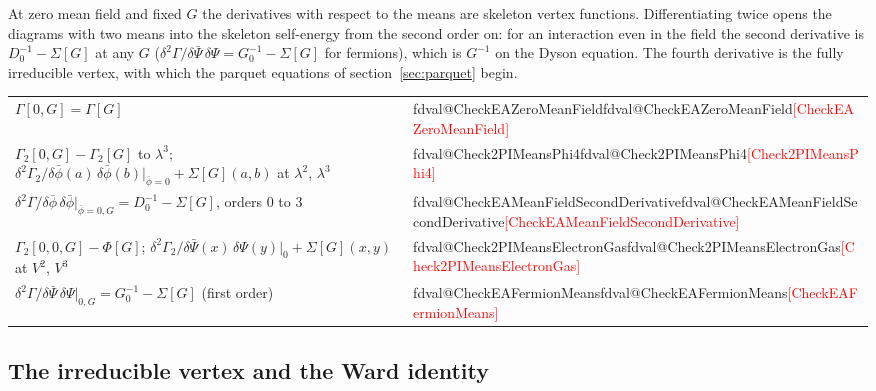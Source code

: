 \documentclass[11pt,a4paper]{article}
\makeatletter
\newcommand{\val}[1]{\ifcsname fdval@#1\endcsname\csname fdval@#1\endcsname\else\textcolor{red}{[#1]}\fi}
\makeatother
\begin{document}
At zero mean field and fixed $G$ the derivatives with respect to the means are skeleton vertex functions. Differentiating
twice opens the diagrams with two means into the skeleton self-energy from the second order on: for an interaction even
in the field the second derivative is $D_0^{-1}-\Sigma[G]$ at any $G$ ($\delta^2\Gamma/\delta\bar\Psi\,\delta\Psi=G_0^{-1}-\Sigma[G]$ for fermions), which is $G^{-1}$
on the Dyson equation. The fourth derivative is the fully irreducible vertex, with which the parquet equations of
section~\ref{sec:parquet} begin.
\begin{result}
\begin{tabular}{@{}l@{\quad}l@{}}
$\Gamma[0,G]=\Gamma[G]$ & \val{CheckEAZeroMeanField}\\
$\Gamma_2[0,G]-\Gamma_2[G]$ to $\lambda^3$; $\delta^2\Gamma_2/\delta\bar\phi(a)\,\delta\bar\phi(b)|_{\bar\phi=0}+\Sigma[G](a,b)$ at $\lambda^2$, $\lambda^3$ & \val{Check2PIMeansPhi4}\\
$\delta^2\Gamma/\delta\bar\phi\,\delta\bar\phi|_{\bar\phi=0,G}=D_0^{-1}-\Sigma[G]$, orders 0 to 3 & \val{CheckEAMeanFieldSecondDerivative}\\
$\Gamma_2[0,0,G]-\Phi[G]$; $\delta^2\Gamma_2/\delta\bar\Psi(x)\,\delta\Psi(y)|_{0}+\Sigma[G](x,y)$ at $V^2$, $V^3$ & \val{Check2PIMeansElectronGas}\\
$\delta^2\Gamma/\delta\bar\Psi\,\delta\Psi|_{0,G}=G_0^{-1}-\Sigma[G]$ (first order) & \val{CheckEAFermionMeans}
\end{tabular}
\end{result}
\subsection{The irreducible vertex and the Ward identity}\label{sec:vertex}
\end{document}
